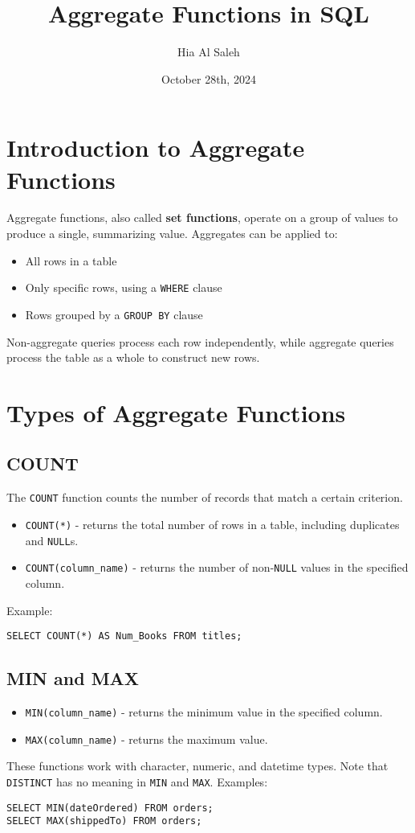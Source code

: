 \documentclass{article}
\begin{document}
\title{Aggregate Functions in SQL}
\author{Hia Al Saleh}
\date{October 28th, 2024}
\maketitle
\tableofcontents
\newpage

\section{Introduction to Aggregate Functions}
Aggregate functions, also called \textbf{set functions}, operate on a group of values to produce a single, summarizing value. Aggregates can be applied to:
\begin{itemize}
    \item All rows in a table
    \item Only specific rows, using a \texttt{WHERE} clause
    \item Rows grouped by a \texttt{GROUP BY} clause
\end{itemize}

Non-aggregate queries process each row independently, while aggregate queries process the table as a whole to construct new rows.

\section{Types of Aggregate Functions}
\subsection{COUNT}
The \texttt{COUNT} function counts the number of records that match a certain criterion.
\begin{itemize}
    \item \texttt{COUNT(*)} - returns the total number of rows in a table, including duplicates and \texttt{NULL}s.
    \item \texttt{COUNT(column\_name)} - returns the number of non-\texttt{NULL} values in the specified column.
\end{itemize}
Example:
\begin{verbatim}
SELECT COUNT(*) AS Num_Books FROM titles;
\end{verbatim}

\subsection{MIN and MAX}
\begin{itemize}
    \item \texttt{MIN(column\_name)} - returns the minimum value in the specified column.
    \item \texttt{MAX(column\_name)} - returns the maximum value.
\end{itemize}
These functions work with character, numeric, and datetime types. Note that \texttt{DISTINCT} has no meaning in \texttt{MIN} and \texttt{MAX}. Examples:
\begin{verbatim}
SELECT MIN(dateOrdered) FROM orders;
SELECT MAX(shippedTo) FROM orders;
\end{verbatim}
\end{document}
